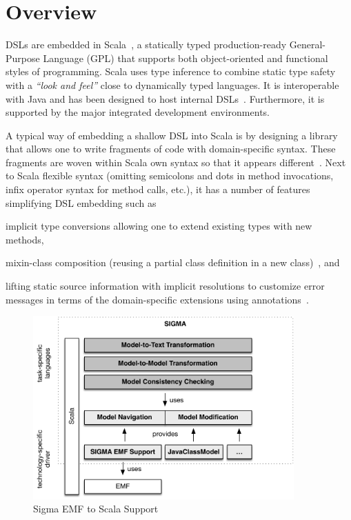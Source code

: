 
\section{\SIGMA Overview}
\label{sec:SigmaOverview}

\SIGMA DSLs are embedded in Scala~\cite{Odersky2004}, a statically typed production-ready General-Purpose Language (GPL) that supports both object-oriented and functional styles of programming.
Scala uses type inference to combine static type safety with a \emph{``look and feel''} close to dynamically typed languages.
It is interoperable with Java and has been designed to host internal DSLs~\cite{Chafi2010}.
Furthermore, it is supported by the major integrated development environments.

A typical way of embedding a shallow DSL into Scala is by designing a library that allows one to write fragments of code with domain-specific syntax.
These fragments are woven within Scala own syntax so that it appears different~\cite{Dubochet2011}.
Next to Scala flexible syntax (\Eg omitting semicolons and dots in method invocations, infix operator syntax for method calls, etc.), it has a number of features simplifying DSL embedding such as
%
\begin{inparaitem}[]
  \item implicit type conversions allowing one to extend existing types with new methods,
  \item mixin-class composition (\Ie reusing a partial class definition in a new class)~\cite{Odersky2004}, and 
  \item lifting static source information with implicit resolutions to customize error messages in terms of the domain-specific extensions using annotations~\cite{Moors2012}.
\end{inparaitem}

\begin{figure}[h!bt]
  \centering
  \includegraphics[width=10cm]{figures/SigmaOverview.pdf}
  \caption{Sigma EMF to Scala Support}
  \label{fig:SigmaStack}
\end{figure}

